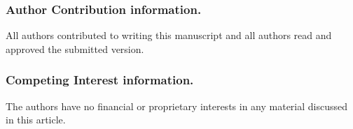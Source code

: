 \documentclass[runningheads,a4paper,english]{llncs}
\begin{document}
\subsubsection*{Author Contribution information.}
All authors contributed to writing this manuscript and all authors read and approved the submitted version.
\subsubsection*{Competing Interest information.}
The authors have no financial or proprietary interests in any material discussed in this article.



\renewcommand{\bibsection}{\section*{References}} %


{}

%
%  

\newpage
\appendix
\end{document}
